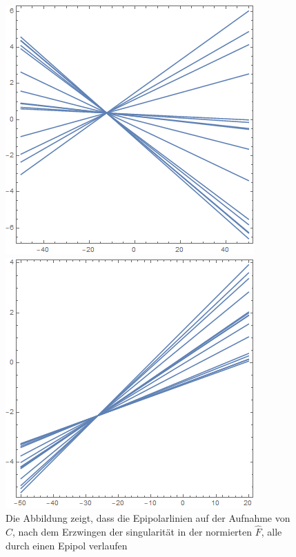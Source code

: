 


\begin{figure}[!htb]
	\includegraphics[width=\linewidth]{images/L_PC1_F_Constraint.png}
	\caption{Die Abbildung zeigt, dass die Epipolarlinien auf der Aufnahme von $C$, nach dem Erzwingen der singularität in der normierten $\hat{F}$, alle durch einen Epipol verlaufen}
	\label{fig:EpipoleWithF1}
	\endminipage\hfill
	\includegraphics[width=\linewidth]{images/LPrime_PC2_F_Constraint.png}

\end{figure}
